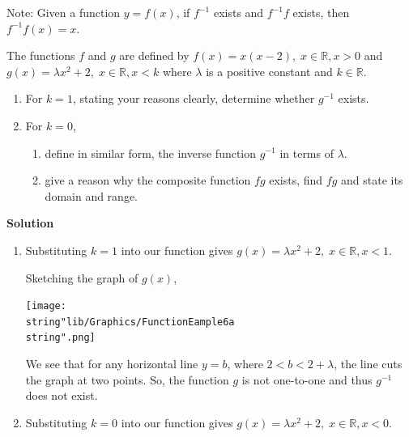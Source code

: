 \documentclass[11pt,a4paper]{book}
\newcommand{\R}{\mathbb{R}}
\begin{document}
Note: Given a function $y=f\left(x\right)$, if $f^{-1}$ exists and $f^{-1}f$ exists, then $f^{-1}f\left(x\right)=x$.

\newpage

\begin{example}{}

The functions $f$ and $g$ are defined by $f\left(x\right)=x\left(x-2\right),\;x\in\R,x>0$ and $g\left(x\right)=\lambda x^{2}+2,\;x\in\R,x<k$ where $\lambda$ is a positive constant and $k\in\R$.

\begin{enumerate}[label=(\alph*)]

\item  For $k=1$, stating your reasons clearly, determine whether
$g^{-1}$ exists.

\item  For $k=0$,

\begin{enumerate}[label=(\roman*)]

\item  define in similar form, the inverse function $g^{-1}$ in
terms of $\lambda$.

\item  give a reason why the composite function $fg$ exists, find
$fg$ and state its domain and range.

\end{enumerate}
\end{enumerate}

\textbf{Solution}

\begin{enumerate}[label=(\alph*)]

\item  Substituting $k=1$ into our function gives $g\left(x\right)=\lambda x^{2}+2,\;x\in\R,x<1$.

Sketching the graph of $g\left(x\right)$,
\begin{center}
\texttt{[image: \\string"lib/Graphics/FunctionEample6a\\string".png]}
\par\end{center}

We see that for any horizontal line $y=b$, where $2<b<2+\lambda$,
the line cuts the graph at two points. So, the function $g$ is not
one-to-one and thus $g^{-1}$ does not exist.

\item  Substituting $k=0$ into our function gives $g\left(x\right)=\lambda x^{2}+2,\;x\in\R,x<0$.


\end{enumerate}
\end{example}
\end{document}
